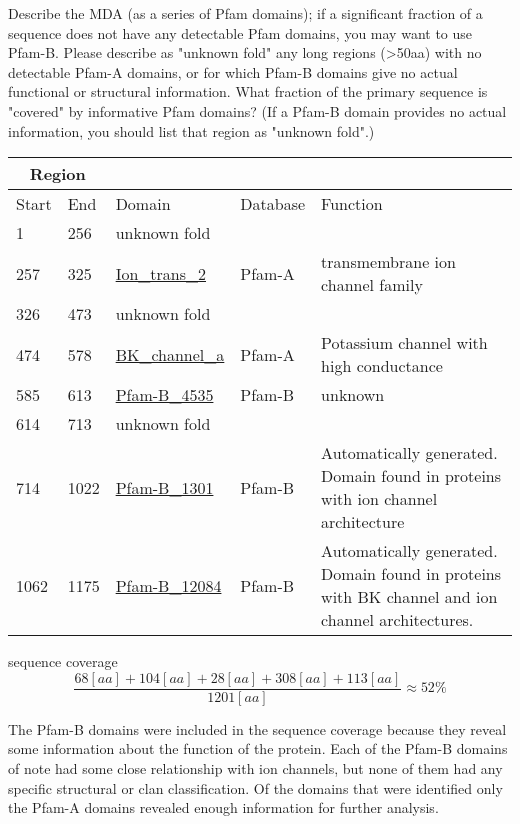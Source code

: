 \documentclass[11pt]{article}
\begin{document}
Describe the MDA (as a series of Pfam domains); 
if a significant fraction of a sequence does not have any detectable 
Pfam domains, you may want to use Pfam-B. 
Please describe as "unknown fold" any long regions (>50aa) with no 
detectable Pfam-A domains, or for which Pfam-B domains give no actual 
functional or structural information. What fraction of the primary 
sequence is "covered" by informative Pfam domains? 
(If a Pfam-B domain provides no actual information, you should list that 
region as "unknown fold".)

\begin{tabular}{| l | l | l | l | p{5cm} |}
\hline
\multicolumn{2}{|c|}{Region} &&&\\ \hline 
Start & End & Domain & Database & Function \\ \hline
1 & 256 & unknown fold && \\ \hline
257 & 325 & \href{http://pfam.sanger.ac.uk/family/PF07885.11}{Ion\_trans\_2} & Pfam-A & transmembrane ion channel family \\ \hline
326 & 473 & unknown fold && \\ \hline
474 & 578 & \href{http://pfam.sanger.ac.uk/family/PF03493.13}{BK\_channel\_a} & Pfam-A & Potassium channel with high conductance \\ \hline
585 & 613 & \href{http://pfam.sanger.ac.uk/pfamb/PB004535}{Pfam-B\_4535} & Pfam-B & unknown \\ \hline
614 & 713 & unknown fold && \\ \hline
714 & 1022 & \href{http://pfam.sanger.ac.uk/pfamb/PB001301}{Pfam-B\_1301} & Pfam-B & Automatically generated. Domain found in proteins with
ion channel architecture \\ \hline
1062 & 1175 & \href{http://pfam.sanger.ac.uk/pfamb/PB012084}{Pfam-B\_12084} & Pfam-B & Automatically generated. Domain found in proteins with
BK channel and ion channel architectures. \\ \hline
\end{tabular}

sequence coverage $$ \frac{68[aa] + 104[aa] + 28[aa] + 308[aa] + 113[aa]}{1201[aa]} \approx 52\% $$ 

The Pfam-B domains were included in the sequence coverage because they reveal some information
about the function of the protein. Each of the Pfam-B domains of note had some close relationship with
ion channels, but none of them had any specific structural or clan classification. 
Of the domains that were identified only the Pfam-A domains revealed enough information
for further analysis.
\end{document}
